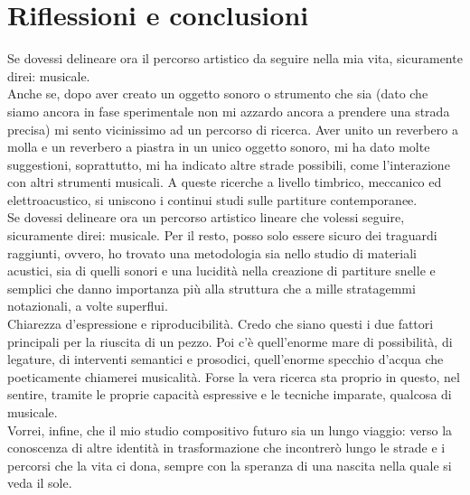 
\chapter{Riflessioni e conclusioni}
\label{chp:Riflessioni e conclusioni}

Se dovessi delineare ora il percorso artistico da seguire nella mia vita, sicuramente direi: musicale. \\
Anche se, dopo aver creato un oggetto sonoro o strumento che sia (dato che siamo ancora in fase sperimentale non mi azzardo ancora a prendere una strada precisa) mi sento vicinissimo ad un percorso di ricerca.
Aver unito un reverbero a molla e un reverbero a piastra in un unico oggetto sonoro, mi ha dato molte suggestioni, soprattutto, mi ha indicato altre strade possibili, come l'interazione con altri strumenti musicali. A queste ricerche a livello timbrico, meccanico ed elettroacustico, si uniscono i continui studi sulle partiture contemporanee. \\
Se dovessi delineare ora un percorso artistico lineare che volessi seguire, sicuramente direi: musicale. Per il resto, posso solo essere sicuro dei traguardi raggiunti, ovvero, ho trovato una metodologia sia nello studio di materiali acustici, sia di quelli sonori e una lucidità nella creazione di partiture snelle e semplici che danno importanza più alla struttura che a mille stratagemmi notazionali, a volte superflui. \\
Chiarezza d'espressione e riproducibilità. Credo che siano questi i due fattori principali per la riuscita di un pezzo. Poi c'è quell'enorme mare di possibilità, di legature, di interventi semantici e prosodici, quell'enorme specchio d'acqua che poeticamente chiamerei musicalità. Forse la vera ricerca sta proprio in questo, nel sentire, tramite le proprie capacità espressive e le tecniche imparate, qualcosa di musicale. \\
Vorrei, infine, che il mio studio compositivo futuro sia un lungo viaggio: verso la conoscenza di altre identità in trasformazione che incontrerò lungo le strade e i percorsi che la vita ci dona, sempre con la speranza di una nascita nella quale si veda il sole.


